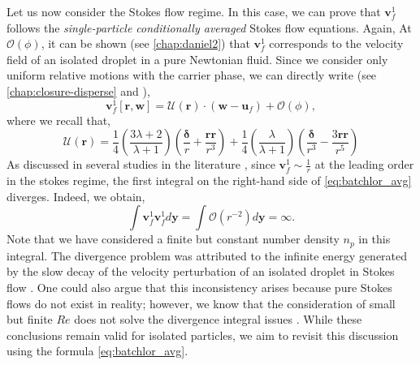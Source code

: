 Let us now consider the Stokes flow regime. 
In this case, we can prove that $\textbf{v}_f^{1}$ follows the \textit{single-particle conditionally averaged} Stokes flow equations. 
Again, At $\mathcal{O}(\phi)$, it can be shown (see \ref{chap:daniel2}) that $\textbf{v}^1_f$ corresponds to the velocity field of an isolated droplet in a pure Newtonian fluid. 
Since we consider only uniform relative motions with the carrier phase, we can directly write (see \ref{chap:closure-disperse} and \citet{kim2013microhydrodynamics}), 
\begin{equation}
    \textbf{v}_f^{1}[\textbf{r},\textbf{w}]
    = 
    \mathcal{U}(\textbf{r}) \cdot (\textbf{w} - \textbf{u}_f)
    + \mathcal{O}(\phi),
    \label{eq:stokes_sol}
\end{equation}
where we recall that,
\begin{equation}
    \mathcal{U}(\textbf{r})= 
    \frac{1}{4}\left(\frac{3\lambda + 2}{\lambda +1}\right)
    \left(\frac{\bm\delta}{r} + \frac{\textbf{rr}}{r^3}\right) 
    + 
    \frac{1}{4}\left(\frac{\lambda}{\lambda +1}\right)
    \left(\frac{\bm\delta}{r^3} - \frac{3 \textbf{rr}}{r^5}\right)
\end{equation}
As discussed in several studies in the literature \citep{caflisch1985variance}, 
since $\textbf{v}_f^{1} \sim \frac{1}{r}$ at the leading order in the stokes regime, the first integral on the right-hand side of \ref{eq:batchlor_avg} diverges. 
Indeed, we obtain,
\begin{equation}
    \int \textbf{v}_f^{1} \textbf{v}_f^{1}  d \textbf{y} = 
    \int \mathcal{O}(r^{-2}) d \textbf{y} = \infty.
    \label{eq:non_convergence}
\end{equation}
Note that we have considered a finite but constant number density $n_p$ in this integral. 
The divergence problem was attributed to the infinite energy generated by the slow decay of the velocity perturbation of an isolated droplet in Stokes flow \citep{caflisch1985variance}. 
One could also argue that this inconsistency arises because pure Stokes flows do not exist in reality; however, we know that the consideration of small but finite $Re$ does not solve the divergence integral issues \citep{koch1993hydrodynamic}. 
While these conclusions remain valid for isolated particles, we aim to revisit this discussion using the formula \ref{eq:batchlor_avg}.

